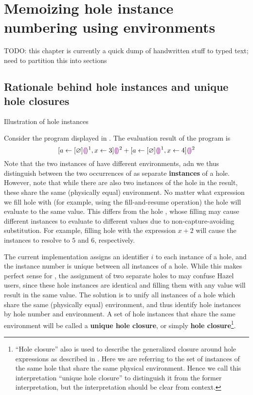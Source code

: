 \section{Memoizing hole instance numbering using environments}
\label{sec:renumbering}

TODO: this chapter is currently a quick dump of handwritten stuff to typed text; need to partition this into sections

\subsection{Rationale behind hole instances and unique hole closures}
\label{sec:instance-illustration}


\begin{listing}
\caption{Illustration of hole instances}
\label{fig:instance-illustration}
\end{listing}

Consider the program displayed in . The evaluation result of the program is \[
[a\leftarrow[\varnothing]\textcolor{violet}{\llparenthesis}\textcolor{violet}{\rrparenthesis}^1,x\leftarrow 3]\textcolor{violet}{\llparenthesis}\textcolor{violet}{\rrparenthesis}^2
+ [a\leftarrow[\varnothing]\textcolor{violet}{\llparenthesis}\textcolor{violet}{\rrparenthesis}^1,x\leftarrow 4]\textcolor{violet}{\llparenthesis}\textcolor{violet}{\rrparenthesis}^2
\] Note that the two instances of  have different environments, adn we thus distinguish between the two occurrences of  as separate \textbf{instances} of a hole. However, note that while there are also two instances of the hole  in the result, these share the same (physically equal) environment. No matter what expression we fill hole  with (for example, using the fill-and-resume operation) the hole will evaluate to the same value. This differs from the hole , whose filling may cause different instances to evaluate to different values due to non-capture-avoiding substitution. For example, filling hole  with the expression $x+2$ will cause the instances to resolve to $5$ and $6$, respectively.

The current implementation assigns an identifier $i$ to each instance of a hole, and the instance number is unique between all instances of a hole. While this makes perfect sense for , the assignment of two separate holes to  may confuse Hazel users, since these hole instances are identical and filling them with any value will result in the same value. The solution is to unify all instances of a hole which share the same (physically equal) environment, and thus identify hole instances by hole number and environment. A set of hole instances that share the same environment will be called a \textbf{unique hole closure}, or simply \textbf{hole closure}\footnote{``Hole closure'' also is used to describe the generalized closure around hole expressions as described in . Here we are referring to the set of instances of the same hole that share the same physical environment. Hence we call this interpretation ``unique hole closure'' to distinguish it from the former interpretation, but the interpretation should be clear from context.}.

